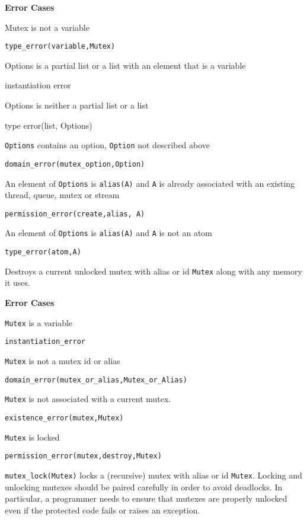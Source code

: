 \begin{description}
{\bf Error Cases}
\bi
\item 	Mutex is not a variable
\bi
\item 	{\tt type\_error(variable,Mutex)}
\ei
\item Options is a partial list or a list with an element that is a
  variable 
\bi
\item  instantiation error
\ei
\item Options is neither a partial list or a list
\bi
\item  type error(list, Options)
\ei
\item 	{\tt Options} contains an option, {\tt Option} not described above
\bi
\item 	{\tt domain\_error(mutex\_option,Option)}
\ei
%
\item An element of {\tt Options} is {\tt alias(A)} and {\tt A} is
  already associated with an existing thread, queue, mutex or stream 
\bi
\item {\tt permission\_error(create,alias, A)}
\ei
\item An element of {\tt Options} is {\tt alias(A)} and {\tt A} is not an atom
\bi
\item {\tt type\_error(atom,A)}
\ei
\ei

%
Destroys a current unlocked mutex with alias or id {\tt Mutex} along
with any memory it uses.

{\bf Error Cases}
\bi
\item 	{\tt Mutex} is a variable
\bi
\item 	{\tt instantiation\_error}
\ei
%
\item 	{\tt Mutex} is not a mutex id or alias
\bi
\item 	{\tt domain\_error(mutex\_or\_alias,Mutex\_or\_Alias)}
\ei
%
\item 	{\tt Mutex} is not associated with a current mutex.
\bi
\item 	{\tt existence\_error(mutex,Mutex)}
\ei
\item 	{\tt Mutex} is locked
\bi
\item 	{\tt permission\_error(mutex,destroy,Mutex)}
\ei
\ei

%
{\tt mutex\_lock(Mutex)} locks a (recursive) mutex with alias or id
{\tt Mutex}. Locking and unlocking mutexes should be paired carefully
in order to avoid deadlocks. In particular, a programmer needs to
ensure that mutexes are properly unlocked even if the protected code
fails or raises an exception.


\end{description}
